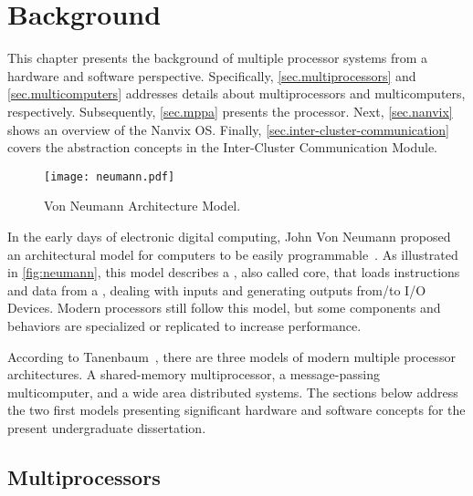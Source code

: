 \chapter{Background}
\label{ch.fundamentation}


	This chapter presents the background of multiple processor
	systems from a hardware and software perspective.
	Specifically, \autoref{sec.multiprocessors} and \autoref{sec.multicomputers}
	addresses details about multiprocessors and multicomputers, respectively.
	Subsequently, \autoref{sec.mppa} presents the \mppa processor.
	Next, \autoref{sec.nanvix} shows an overview of the Nanvix OS.
	Finally, \autoref{sec.inter-cluster-communication} covers the abstraction
	concepts in the Inter-Cluster Communication Module.

	\begin{figure}[t]
		\centering%
		\caption{Von Neumann Architecture Model.}%
		\label{fig:neumann}%
		\texttt{[image: neumann.pdf]}%
	\end{figure}

	In the early days of electronic digital computing, John Von Neumann
	proposed an architectural model for computers to be easily programmable~\cite{von-neumann:model}.
	As illustrated in \autoref{fig:neumann}, this model describes a \cpu,
	also called core, that loads instructions and data from a \mmu,
	dealing with inputs and generating outputs from/to I/O Devices.
	Modern processors still follow this model, but some components and
	behaviors are specialized or replicated to increase performance.

	According to Tanenbaum~\cite{tanenbaum:4ed}, there are three models of
	modern multiple processor architectures.
	A shared-memory multiprocessor, a message-passing multicomputer, and a wide
	area distributed systems.
	The sections below address the two first models presenting significant
	hardware and software concepts for the present undergraduate dissertation.

	\section{Multiprocessors}
	\label{sec.multiprocessors}


